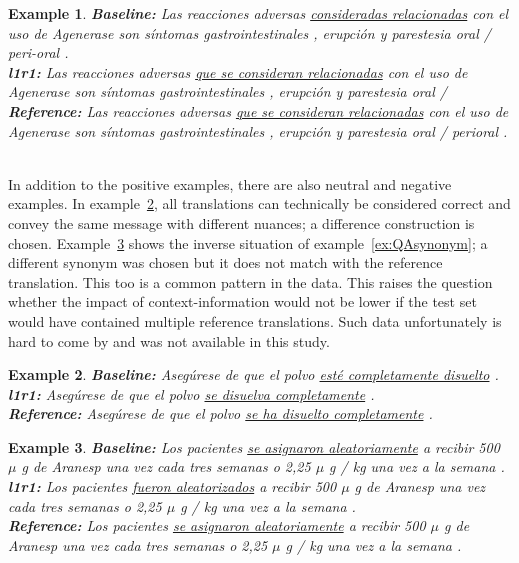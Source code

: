 \documentclass[smallextended]{svjour3}       %
\theoremstyle{break}
\newtheorem{exmp}{Example}[section]
\begin{document}
\begin{exmp}
\footnotesize
\label{ex:QAgrammar}
\textbf{Baseline:} Las reacciones adversas \underline{consideradas relacionadas} con el uso de Agenerase son síntomas gastrointestinales , erupción y parestesia oral / peri-oral . \\
\textbf{l1r1:}  Las reacciones adversas \underline{que se consideran relacionadas} con el uso de Agenerase son síntomas gastrointestinales , erupción y parestesia oral / \\
\textbf{Reference:} Las reacciones adversas \underline{que se consideran relacionadas} con el uso de Agenerase son síntomas gastrointestinales , erupción y parestesia oral / perioral . \\ \\
\end{exmp}

In addition to the positive examples, there are also neutral and negative
examples. In example~\ref{ex:QAneutral}, all translations can technically be
considered correct and convey the same message with different nuances; a
difference construction is chosen. Example~\ref{ex:QAnegative} shows the
inverse situation of example~\ref{ex:QAsynonym}; a different synonym was chosen
but it does not match with the reference translation. This too is a common
pattern in the data. This raises the question whether the impact of
context-information would not be lower if the test set would have contained
multiple reference translations. Such data unfortunately is hard to come by and
was not available in this study.

\begin{exmp}
\footnotesize
\label{ex:QAneutral}
\textbf{Baseline:} Asegúrese de que el polvo \underline{esté completamente disuelto} . \\
\textbf{l1r1:} Asegúrese de que el polvo \underline{se disuelva completamente} .  \\
\textbf{Reference:} Asegúrese de que el polvo \underline{se ha disuelto completamente} .
\end{exmp}

\begin{exmp}
\footnotesize
\label{ex:QAnegative}
\textbf{Baseline:} Los pacientes \underline{se asignaron aleatoriamente} a recibir 500 $\mu$ g de Aranesp una vez cada tres semanas o 2,25 $\mu$ g / kg una vez a la semana . \\
\textbf{l1r1:} Los pacientes \underline{fueron aleatorizados} a recibir 500 $\mu$ g de Aranesp una vez cada tres semanas o 2,25 $\mu$ g / kg una vez a la semana . \\
\textbf{Reference:} Los pacientes \underline{se asignaron aleatoriamente} a recibir 500 $\mu$ g de Aranesp una vez cada tres semanas o 2,25 $\mu$ g / kg una vez a la semana .
\end{exmp}
\end{document}
